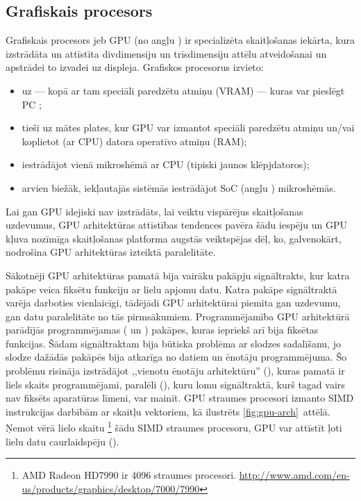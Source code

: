 \subsection{Grafiskais procesors} \label{sec:gpu}
Grafiskais procesors jeb GPU (no angļu )
ir specializēta skaitļošanas iekārta, kura izstrādāta
un attīstīta divdimensiju un trīsdimensiju attēlu atveidošanai un apstrādei
to izvadei uz displeja.
Grafiskos procesorus izvieto:
\begin{itemize}
	\item uz  --- kopā ar tam speciāli paredzētu
		atmiņu (VRAM) --- kuras var pieslēgt PC ;
	\item tieši uz mātes plates, kur GPU var izmantot speciāli paredzētu
		atmiņu un/vai koplietot (ar CPU) datora operatīvo atmiņu (RAM);
	\item iestrādājot vienā mikroshēmā ar CPU (tipiski jaunos klēpjdatoros);
	\item arvien biežāk, iekļautajās sistēmās iestrādājot SoC
		(angļu ) mikroshēmās.
\end{itemize}

Lai gan GPU idejiski nav izstrādāts, lai veiktu vispārējus skaitļošanas
uzdevumus, GPU arhitektūras attīstības tendences pavēra šādu iespēju un GPU
kļuva nozīmīga skaitļošanas platforma augstās veiktspējas dēļ, ko,
galvenokārt, nodrošina GPU arhitektūras izteiktā paralelitāte.

Sākotnēji GPU arhitektūras pamatā bija vairāku pakāpju signāltrakts, kur
katra pakāpe veica fiksētu funkciju ar lielu apjomu datu. Katra pakāpe
signāltraktā varēja darboties vienlaicīgi, tādējādi GPU arhitektūrai
piemita gan uzdevumu, gan datu paralelitāte no tās pirmsākumiem.
Programmējamība GPU arhitektūrā parādījās programmējamas 
( un ) pakāpes,
kuras iepriekš arī bija fiksētas funkcijas. Šādam signāltraktam bija būtiska
problēma ar slodzes sadalīšanu, jo slodze dažādās pakāpēs bija atkarīga
no datiem un ēnotāju programmējuma. Šo problēmu risināja izstrādājot
,,vienotu ēnotāju arhitektūru'' (),
kuras pamatā ir liels skaits programmējami, paralēli
 (), kuru lomu
signāltraktā, kurš tagad vairs nav fiksēts aparatūras līmeni, var mainīt.
GPU straumes procesori izmanto SIMD instrukcijas darbībām ar skaitļu
vektoriem, kā ilustrēts \ref{fig:gpu-arch}~attēlā. Ņemot vērā lielo skaitu%
\footnote{AMD Radeon HD7990 ir 4096 straumes procesori.
	\url{http://www.amd.com/en-us/products/graphics/desktop/7000/7990}}
šādu SIMD straumes procesoru, GPU var attīstīt ļoti lielu datu caurlaidspēju
().
\cite{Fatahalian}\cite{Owens-GPU}

